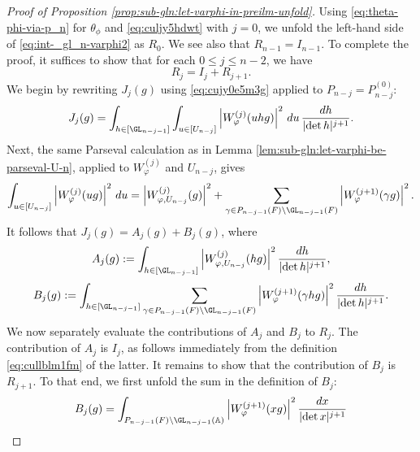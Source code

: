 \begin{proof}[Proof of Proposition \ref{prop:sub-gln:let-varphi-in-preilm-unfold}]
  Using \eqref{eq:theta-phi-via-p_n} for $\theta_\phi$ and \eqref{eq:culjy5hdwt} with $j=0$, we unfold the left-hand side of \eqref{eq:int-_gl_n-varphi2} as $R_0$.  We see also that $R_{n-1}=I_{n-1}$.  To complete the proof, it suffices to show that for each $0 \leq j \leq n - 2$, we have
  \begin{equation*}
    R_j = I_j + R_{j+1}.
  \end{equation*}
  We begin by rewriting $J_j(g)$ using \eqref{eq:cujy0e5m3g} applied to $P_{n-j} = P_{n - j}^{(0)}$:
  \begin{equation*}
    J_j(g)
    =
    \int_{h \in [\GL_{n-j-1}]}
    \int_{u \in [U_{n-j}]}
    \left\lvert W_\varphi^{(j)}(u h g) \right\rvert^2\, d u\,
    \frac{d h}{\lvert \det h \rvert^{j+1}}.
  \end{equation*}
  Next, the same Parseval calculation as in Lemma \ref{lem:sub-gln:let-varphi-be-parseval-U-n}, applied to $W_\varphi^{(j)}$ and $U_{n-j}$, gives
  \begin{equation*}
    \int_{u \in [U_{n-j}]}
    \left\lvert W_\varphi^{(j)}(u g) \right\rvert^2\, d u
    =
    \left\lvert W_{\varphi,U_{n-j}}^{(j)}(g) \right\rvert^2
    +
    \sum_{\gamma \in P_{n-j-1}(F) \backslash \GL_{n-j-1}(F)}
    \left\lvert W_\varphi^{(j+1)}(\gamma g) \right\rvert^2.
  \end{equation*}
  It follows that $J_j(g) = A_j(g) + B_j(g)$, where
  \begin{equation*}
    A_j(g)
    :=
    \int_{h \in [\GL_{n-j-1}]}
    \left\lvert W_{\varphi,U_{n-j}}^{(j)}(h g) \right\rvert^2
    \frac{d h}{\lvert \det h \rvert^{j+1}},
  \end{equation*}
  \begin{equation*}
    B_j(g)
    :=
    \int_{h \in [\GL_{n-j-1}]}
    \sum_{\gamma \in P_{n-j-1}(F) \backslash \GL_{n-j-1}(F)}
    \left\lvert W_\varphi^{(j+1)}(\gamma h g) \right\rvert^2
    \frac{d h}{\lvert \det h \rvert^{j+1}}.
  \end{equation*}
  We now separately evaluate the contributions of $A_j$ and $B_j$ to $R_j$.  The contribution of $A_j$ is $I_j$, as follows immediately from the definition \eqref{eq:cullblm1fm} of the latter.  It remains to show that the contribution of $B_j$ is $R_{j + 1}$.  To that end, we first unfold the sum in the definition of $B_j$:
  \begin{align*}
    B_j(g)
    &=
      \int_{P_{n-j-1}(F) \backslash \GL_{n-j-1}(\mathbb{A})}
      \left\lvert W_{\varphi}^{(j+1)}(x g) \right\rvert^2
      \frac{d x}{\lvert \det x \rvert^{j+1}} \\

\end{align*}
\end{proof}
